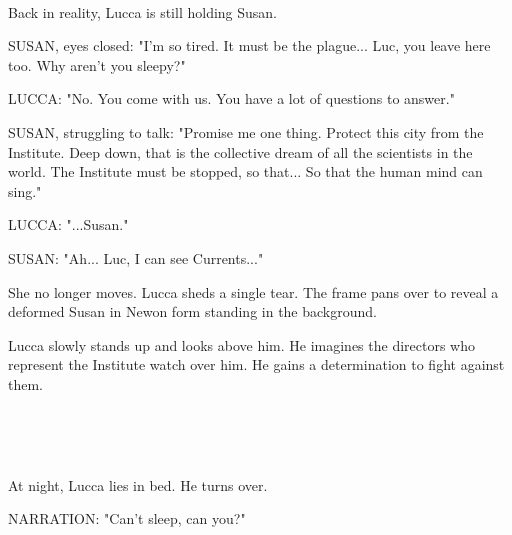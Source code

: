 \documentclass[11pt]{article}
\begin{document}
\ 

Back in reality, Lucca is still holding Susan.

SUSAN, eyes closed: "I'm so tired.
It must be the plague...
Luc, you leave here too.
Why aren't you sleepy?"

LUCCA: "No. You come with us. 
You have a lot of questions to answer."

SUSAN, struggling to talk: "Promise me one thing.
Protect this city from the Institute.
Deep down, that is the collective dream of all the scientists in the world.
The Institute must be stopped, so that...
So that the human mind can sing."

LUCCA: "...Susan."

SUSAN: "Ah... Luc, I can see Currents..."

She no longer moves.
Lucca sheds a single tear.
The frame pans over to reveal a deformed Susan in Newon form standing in the background.

Lucca slowly stands up and looks above him.
He imagines the directors who represent the Institute watch over him.
He gains a determination to fight against them. 

\ 

\ 

At night, Lucca lies in bed.
He turns over.

NARRATION: "Can't sleep, can you?"
\end{document}
